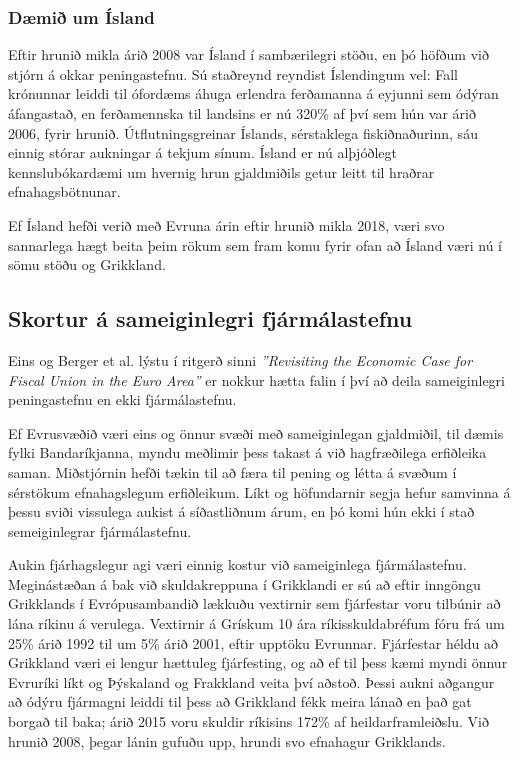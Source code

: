 \documentclass[a4paper]{article}
\begin{document}
\subsubsection{Dæmið um Ísland}

Eftir hrunið mikla árið 2008 var Ísland í sambærilegri stöðu, en þó höfðum við stjórn á okkar peningastefnu. Sú staðreynd reyndist Íslendingum vel: Fall krónunnar leiddi til ófordæms áhuga erlendra ferðamanna á eyjunni sem ódýran áfangastað,\cite{worldfinance_2015} en ferðamennska til landsins er nú 320\% af því sem hún var árið 2006, fyrir hrunið.\cite{hagstofan_passengers} Útflutningsgreinar Íslands, sérstaklega fiskiðnaðurinn, sáu einnig stórar aukningar á tekjum sínum. Ísland er nú alþjóðlegt kennslubókardæmi um hvernig hrun gjaldmiðils getur leitt til hraðrar efnahagsbötnunar.\cite{worldfinance_2015}

Ef Ísland hefði verið með Evruna árin eftir hrunið mikla 2018, væri svo sannarlega hægt beita þeim rökum sem fram komu fyrir ofan að Ísland væri nú í sömu stöðu og Grikkland.

\subsection{Skortur á sameiginlegri fjármálastefnu}

Eins og Berger et al. lýstu í ritgerð sinni \textit{''Revisiting the Economic Case for Fiscal Union in the Euro Area''} er nokkur hætta falin í því að deila sameiginlegri peningastefnu en ekki fjármálastefnu.

Ef Evrusvæðið væri eins og önnur svæði með sameiginlegan gjaldmiðil, til dæmis fylki Bandaríkjanna, myndu meðlimir þess takast á við hagfræðilega erfiðleika saman. Miðstjórnin hefði tækin til að færa til pening og létta á svæðum í sérstökum efnahagslegum erfiðleikum. Líkt og höfundarnir segja hefur samvinna á þessu sviði vissulega aukist á síðastliðnum árum, en þó komi hún ekki í stað semeiginlegrar fjármálastefnu.\cite{fiscal_union}

Aukin fjárhagslegur agi væri einnig kostur við sameiginlega fjármálastefnu. Meginástæðan á bak við skuldakreppuna í Grikklandi er sú að eftir inngöngu Grikklands í Evrópusambandið lækkuðu vextirnir sem fjárfestar voru tilbúnir að lána ríkinu á verulega. Vextirnir á Grískum 10 ára ríkisskuldabréfum fóru frá um 25\% árið 1992 til um 5\% árið 2001, eftir upptöku Evrunnar. Fjárfestar héldu að Grikkland væri ei lengur hættuleg fjárfesting, og að ef til þess kæmi myndi önnur Evruríki líkt og Þýskaland og Frakkland veita því aðstoð. Þessi aukni aðgangur að ódýru fjármagni leiddi til þess að Grikkland fékk meira lánað en það gat borgað til baka; árið 2015 voru skuldir ríkisins 172\% af heildarframleiðslu. Við hrunið 2008, þegar lánin gufuðu upp, hrundi svo efnahagur Grikklands.\cite{vox_greece}
\end{document}
